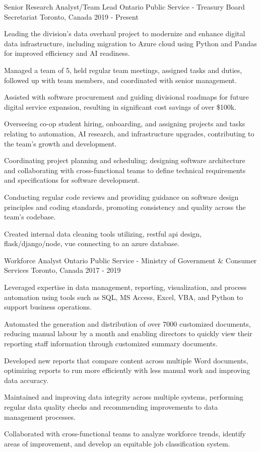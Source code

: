 \begin{cventries}
\cventry
  {Senior Research Analyst/Team Lead}
  {Ontario Public Service - Treasury Board Secretariat}
  {Toronto, Canada}
  {2019 - Present}
  {
    \begin{cvitems}
      \item Leading the division's data overhaul project to modernize and enhance digital data infrastructure, including migration to Azure cloud using Python and Pandas for improved efficiency and AI readiness.
      \item Managed a team of 5, held regular team meetings, assigned tasks and duties, followed up with team members, and coordinated with senior management. 
      \item  Assisted with software procurement and guiding divisional roadmaps for future digital service expansion, resulting in significant cost savings of over \$100k.
      \item Overseeing co-op student hiring, onboarding, and assigning projects and tasks relating to automation, AI research, and infrastructure upgrades, contributing to the team's growth and development.
      \item Coordinating project planning and scheduling; designing software architecture and collaborating with cross-functional teams to define technical requirements and specifications for software development.
      \item Conducting regular code reviews and providing guidance on software design principles and coding standards, promoting consistency and quality across the team's codebase.
      \item Created internal data cleaning tools utilizing, restful api design, flask/django/node, vue connecting to an azure database. 
    \end{cvitems}
  }

\cventry
  {Workforce Analyst}
  {Ontario Public Service - Ministry of Government \& Consumer Services}
  {Toronto, Canada}
  {2017 - 2019}
  {
    \begin{cvitems}
      \item Leveraged expertise in data management, reporting, visualization, and process automation using tools such as SQL, MS Access, Excel, VBA, and Python to support business operations.
      \item Automated the generation and distribution of over 7000 customized documents, reducing manual labour by a month and enabling directors to quickly view their reporting staff information through customized summary documents.
      \item Developed new reports that compare content across multiple Word documents, optimizing reports to run more efficiently with less manual work and improving data accuracy.
      \item Maintained and improving data integrity across multiple systems, performing regular data quality checks and recommending improvements to data management processes.
      \item Collaborated with cross-functional teams to analyze workforce trends, identify areas of improvement, and develop an equitable job classification system.
    \end{cvitems}
  }


\end{cventries}
